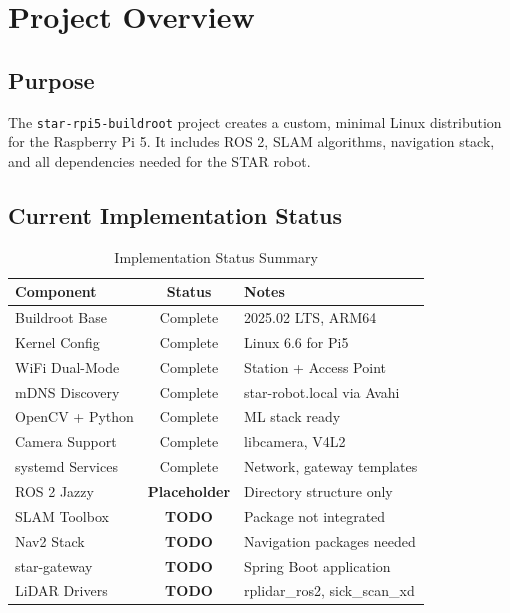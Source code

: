 \section{Project Overview}

\subsection{Purpose}

The \texttt{star-rpi5-buildroot} project creates a custom, minimal Linux distribution for the Raspberry Pi 5. It includes ROS 2, SLAM algorithms, navigation stack, and all dependencies needed for the STAR robot.

\subsection{Current Implementation Status}

\begin{table}[H]
\centering
\begin{tabular}{|l|c|l|}
\hline
\textbf{Component} & \textbf{Status} & \textbf{Notes} \\
\hline
Buildroot Base & Complete & 2025.02 LTS, ARM64 \\
Kernel Config & Complete & Linux 6.6 for Pi5 \\
WiFi Dual-Mode & Complete & Station + Access Point \\
mDNS Discovery & Complete & star-robot.local via Avahi \\
OpenCV + Python & Complete & ML stack ready \\
Camera Support & Complete & libcamera, V4L2 \\
systemd Services & Complete & Network, gateway templates \\
\hline
ROS 2 Jazzy & \textbf{Placeholder} & Directory structure only \\
SLAM Toolbox & \textbf{TODO} & Package not integrated \\
Nav2 Stack & \textbf{TODO} & Navigation packages needed \\
star-gateway & \textbf{TODO} & Spring Boot application \\
LiDAR Drivers & \textbf{TODO} & rplidar\_ros2, sick\_scan\_xd \\
\hline
\end{tabular}
\caption{Implementation Status Summary}
\end{table}

